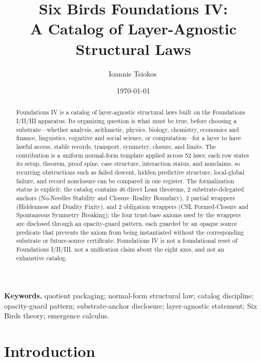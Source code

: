 \documentclass[11pt]{article}
\title{Six Birds Foundations IV:\\
A Catalog of Layer-Agnostic Structural Laws}
\author{Ioannis Tsiokos\,\orcidlink{0009-0009-7659-5964}}
\date{\today}
\theoremstyle{definition}
\begin{document}
\sloppy
{}

\maketitle
\thispagestyle{firstpage}

\begin{abstract}
Foundations IV is a catalog of layer-agnostic structural laws built on
the Foundations I/II/III apparatus. Its organizing question is what
must be true, before choosing a substrate---whether analysis,
arithmetic, physics, biology, chemistry, economics and finance,
linguistics, cognitive and social science, or computation---for a
layer to have lawful access, stable records, transport, symmetry,
closure, and limits.  The contribution is
a uniform normal-form template applied across 52 laws; each row states
its setup, theorem, proof spine, case structure, interaction status,
and nonclaims, so recurring obstructions such as failed descent, hidden
predictive structure, local-global failure, and record nonclosure can
be compared in one register.  The formalization status is explicit: the
catalog contains 46 direct Lean theorems, 2 substrate-delegated anchors
(No-Needles Stability and Closure--Reality Boundary), 2 partial
wrappers (Hiddenness and Duality Fixity), and 2 obligation wrappers
(CSL Formed-Closure and Spontaneous Symmetry Breaking); the four
trust-base axioms used by the wrappers are disclosed through an
opacity-guard pattern, each guarded by an opaque source predicate that
prevents the axiom from being instantiated without the corresponding
substrate or future-source certificate.  Foundations IV is not a
foundational reset of Foundations I/II/III, not a unification claim
about the eight axes, and not an exhaustive catalog.
\end{abstract}

\medskip
\noindent\textbf{Keywords.} quotient packaging; normal-form structural law;
catalog discipline; opacity-guard pattern; substrate-anchor disclosure;
layer-agnostic statement; Six Birds theory; emergence calculus.

\section{Introduction}\label{sec:intro}
\end{document}
